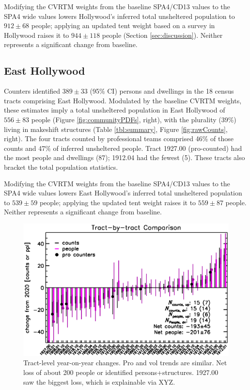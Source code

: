\documentclass[11pt,twocolumn]{article}
\begin{document}
Modifying the CVRTM weights from the baseline SPA4/CD13 values to the SPA4 wide values 
lowers Hollywood's inferred total unsheltered population to $912\pm68$ people; applying
an updated tent weight based on a survey in Hollywood raises it to $944\pm118$ people (Section
\ref{sec:discussion}). Neither represents a significant change from baseline.

\subsection{East Hollywood}
\label{sec:eHo}

Counters identified $389\pm33$ (95\% CI) persons and dwellings in the 18 census tracts 
comprising East Hollywood. Modulated by the baseline CVRTM weights, these estimates imply 
a total unsheltered population in East Hollywood of $556\pm83$ people (Figure \ref{fig:communityPDFs},
right), with the plurality (39\%) living in makeshift structures (Table \ref{tbl:summary}, 
Figure \ref{fig:rawCounts}, right). The four tracts counted by professional teams comprised 46\% of 
those counts and 47\% of inferred unsheltered people. Tract 1927.00 (pro-counted) had the 
most people and dwellings (87); 1912.04 had the fewest (5). These tracts also bracket the 
total population statistics. 

Modifying the CVRTM weights from the baseline SPA4/CD13 values to the SPA4 wide values 
lowers East Hollywood's inferred total unsheltered population to $539\pm59$ people; applying
the updated tent weight raises it to $559\pm87$ people. Neither represents a significant change from 
baseline.

\begin{figure}[]
	\centering
	\includegraphics[width = 0.8\linewidth, trim = 0cm 0cm 0cm 0cm]{tractsYrYr}
	\caption{Tract-level year-on-year changes. Pro and vol trends are similar. Net loss of
			about 200 people or identified persons+structures. 1927.00 saw the biggest
			loss, which is explainable via XYZ.}
	\label{fig:tractYrYr}
\end{figure}
\end{document}
